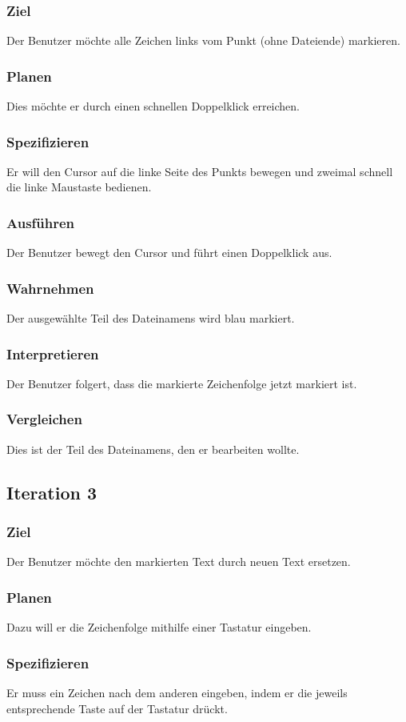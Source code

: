 \subsubsection*{Ziel}
Der Benutzer möchte alle Zeichen links vom Punkt (ohne Dateiende) markieren.
\subsubsection*{Planen}
Dies möchte er durch einen schnellen Doppelklick erreichen.
\subsubsection*{Spezifizieren}
Er will den Cursor auf die linke Seite des Punkts bewegen und zweimal schnell die linke Maustaste bedienen.
\subsubsection*{Ausführen}
Der Benutzer bewegt den Cursor und führt einen Doppelklick aus.
\subsubsection*{Wahrnehmen}
Der ausgewählte Teil des Dateinamens wird blau markiert.
\subsubsection*{Interpretieren}
Der Benutzer folgert, dass die markierte Zeichenfolge jetzt markiert ist.
\subsubsection*{Vergleichen}
Dies ist der Teil des Dateinamens, den er bearbeiten wollte.

\subsection*{Iteration 3}
\subsubsection*{Ziel}
Der Benutzer möchte den markierten Text durch neuen Text ersetzen.
\subsubsection*{Planen}
Dazu will er die Zeichenfolge mithilfe einer Tastatur eingeben.
\subsubsection*{Spezifizieren}
Er muss ein Zeichen nach dem anderen eingeben, indem er die jeweils entsprechende Taste auf der Tastatur drückt.
